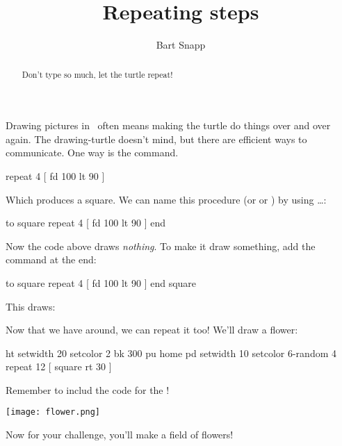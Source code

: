 \documentclass[noauthor,nooutcomes,12pt]{ximera}
\title{Repeating steps}
\author{Bart Snapp}
\begin{document}
\begin{abstract}
  Don't type so much, let the turtle repeat!
\end{abstract}
\maketitle

\nameblankgen

\begin{multicols*}{2}
  Drawing pictures in \LOGO\ often means making the turtle do things
  over and over again. The drawing-turtle doesn't mind, but there are
  efficient ways to communicate. One way is the  command.
\begin{logo}
repeat 4 [
  fd 100
  lt 90
  ]
\end{logo}

Which produces a square. We can name this procedure  (or
 or ) by using  \dots {}:

\begin{logo}
to square
  repeat 4 [ fd 100 lt 90 ]
end
\end{logo}
Now the code above draws \emph{nothing}. To make it draw something, add the command  at the end:
\begin{logo}
to square
  repeat 4 [ fd 100 lt 90 ]
end
square  
\end{logo}
This draws:
\begin{logoout}
\end{logoout}

Now that we have  around, we can repeat it too! We'll draw a flower:

\begin{logo}
ht
setwidth 20 setcolor 2
bk 300
pu home pd
setwidth 10 setcolor 6-random 4
repeat 12 [ square rt 30 ]
\end{logo}
Remember to includ the code for the !
\begin{logoout}
    \texttt{[image: flower.png]}
\end{logoout}

Now for your challenge, you'll make a field of flowers!


\end{multicols*}
\end{document}
